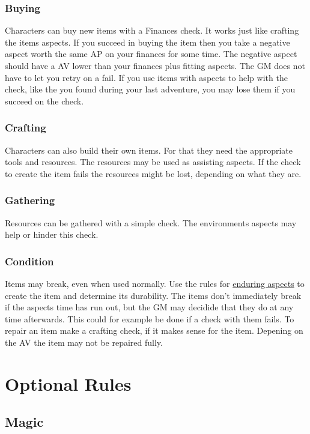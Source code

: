 \documentclass[11pt]{article}
\begin{document}
{\subsubsection{Buying}
\label{sec:org2dddded}

Characters can buy new items with a Finances check. It works just like crafting the items aspects. If you succeed in buying the item then you take a negative aspect  worth the same AP on your finances for some time. The negative aspect should have a AV lower than your finances plus fitting aspects. The GM does not have to let you retry on a fail. If you use items with aspects to help with the check, like the  you found during your last adventure, you may lose them if you succeed on the check.
\subsubsection{Crafting}
\label{sec:org2d84687}

Characters can also build their own items. For that they need the appropriate tools and resources. The resources may be used as assisting aspects. If the check to create the item fails the resources might be lost, depending on what they are.
\subsubsection{Gathering}
\label{sec:orgfb396a0}
Resources can be gathered with a simple check. The environments aspects may help or hinder this check.
\subsubsection{Condition}
\label{sec:org393fa7c}
Items may break, even when used normally. Use the rules for \hyperref[sec:org97ab889]{enduring aspects} to create the item and determine its durability. The items don't immediately break if the aspects time has run out, but the GM may decidide that they do at any time afterwards. This could for example be done if a check with them fails. To repair an item make a crafting check, if it makes sense for the item. Depening on the AV the item may not be repaired fully.
\section{Optional Rules}
\label{sec:orgd38371d}
\subsection{Magic}
\label{sec:org34b5e81}

}
\end{document}
